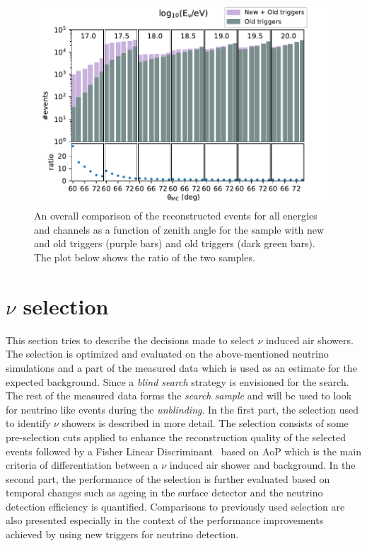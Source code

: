 \begin{figure}[h!]
  \centering
  \includegraphics[width=14.5cm]{thesis_figures/Nu_analysis/MC_control/Events_vs_angle_summary_new.pdf}
  \caption{An overall comparison of the reconstructed events for all energies and channels as a function of zenith angle for the sample with new and old triggers (purple bars) and old triggers (dark green bars). The plot below shows the ratio of the two samples.}
  \label{fig:Events_vs_angle_summary}
\end{figure}


\section{\texorpdfstring{$\nu$}{} selection}
\label{sec:nu_sel}

This section tries to describe the decisions made to select $\nu$ induced air showers. The selection is optimized and evaluated on the above-mentioned neutrino simulations and a part of the measured data which is used as an estimate for the expected background. Since a \textit{blind search} strategy is envisioned for the search. The rest of the measured data forms the \textit{search sample} and will be used to look for neutrino like events during the \textit{unblinding}. 
In the first part, the selection used to identify $\nu$ showers is described in more detail. The selection consists of some pre-selection cuts applied to enhance the reconstruction quality of the selected events followed by a Fisher Linear Discriminant~\cite{Fisher_illustrative} based on AoP which is the main criteria of differentiation between a $\nu$ induced air shower and background.  
In the second part, the performance of the selection is further evaluated based on temporal changes such as ageing in the surface detector and the neutrino detection efficiency is quantified. Comparisons to previously used selection are also presented especially in the context of the performance improvements achieved by using new triggers for neutrino detection.


